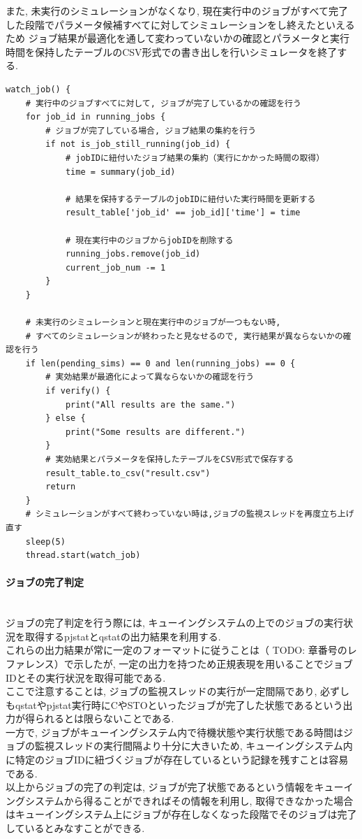 また, 未実行のシミュレーションがなくなり, 現在実行中のジョブがすべて完了した段階でパラメータ候補すべてに対してシミュレーションをし終えたといえるため
ジョブ結果が最適化を通して変わっていないかの確認とパラメータと実行時間を保持したテーブルのCSV形式での書き出しを行いシミュレータを終了する.\\
{\footnotesize
\begin{lstlisting}[numbers=none, caption=ジョブ実行の監視と後処理　疑似コード]
watch_job() {
    # 実行中のジョブすべてに対して, ジョブが完了しているかの確認を行う
    for job_id in running_jobs {
        # ジョブが完了している場合, ジョブ結果の集約を行う
        if not is_job_still_running(job_id) {
            # jobIDに紐付いたジョブ結果の集約（実行にかかった時間の取得）
            time = summary(job_id)

            # 結果を保持するテーブルのjobIDに紐付いた実行時間を更新する
            result_table['job_id' == job_id]['time'] = time

            # 現在実行中のジョブからjobIDを削除する
            running_jobs.remove(job_id)
            current_job_num -= 1
        }
    }

    # 未実行のシミュレーションと現在実行中のジョブが一つもない時,
    # すべてのシミュレーションが終わったと見なせるので, 実行結果が異ならないかの確認を行う
    if len(pending_sims) == 0 and len(running_jobs) == 0 {
        # 実効結果が最適化によって異ならないかの確認を行う
        if verify() {
            print("All results are the same.")
        } else {
            print("Some results are different.")
        }
        # 実効結果とパラメータを保持したテーブルをCSV形式で保存する
        result_table.to_csv("result.csv")
        return
    }
    # シミュレーションがすべて終わっていない時は,ジョブの監視スレッドを再度立ち上げ直す
    sleep(5)
    thread.start(watch_job)
\end{lstlisting}
}

\paragraph{ジョブの完了判定}~\\
ジョブの完了判定を行う際には, キューイングシステムの上でのジョブの実行状況を取得するpjstatとqstatの出力結果を利用する.\\
これらの出力結果が常に一定のフォーマットに従うことは（ TODO: 章番号のレファレンス）で示したが, 一定の出力を持つため正規表現を用いることでジョブIDとその実行状況を取得可能である.\\
ここで注意することは, ジョブの監視スレッドの実行が一定間隔であり,
必ずしもqstatやpjstat実行時にCやSTOといったジョブが完了した状態であるという出力が得られるとは限らないことである.\\
一方で, ジョブがキューイングシステム内で待機状態や実行状態である時間はジョブの監視スレッドの実行間隔より十分に大きいため,
キューイングシステム内に特定のジョブIDに紐づくジョブが存在しているという記録を残すことは容易である.\\
以上からジョブの完了の判定は, ジョブが完了状態であるという情報をキューイングシステムから得ることができればその情報を利用し,
取得できなかった場合はキューイングシステム上にジョブが存在しなくなった段階でそのジョブは完了しているとみなすことができる.\\

